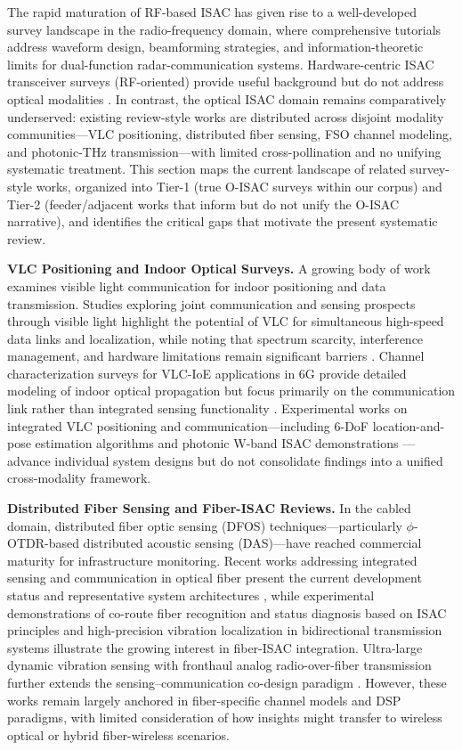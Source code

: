 The rapid maturation of RF-based ISAC has given rise to a well-developed survey landscape in the radio-frequency domain, where comprehensive tutorials address waveform design, beamforming strategies, and information-theoretic limits for dual-function radar-communication systems. Hardware-centric ISAC transceiver surveys (RF-oriented) provide useful background but do not address optical modalities \cite{O_ISAC_161}. In contrast, the optical ISAC domain remains comparatively underserved: existing review-style works are distributed across disjoint modality communities---VLC positioning, distributed fiber sensing, FSO channel modeling, and photonic-THz transmission---with limited cross-pollination and no unifying systematic treatment. This section maps the current landscape of related survey-style works, organized into Tier-1 (true O-ISAC surveys within our corpus) and Tier-2 (feeder/adjacent works that inform but do not unify the O-ISAC narrative), and identifies the critical gaps that motivate the present systematic review.

\textbf{VLC Positioning and Indoor Optical Surveys.} A growing body of work examines visible light communication for indoor positioning and data transmission. Studies exploring joint communication and sensing prospects through visible light highlight the potential of VLC for simultaneous high-speed data links and localization, while noting that spectrum scarcity, interference management, and hardware limitations remain significant barriers \cite{O_ISAC_068}. Channel characterization surveys for VLC-IoE applications in 6G provide detailed modeling of indoor optical propagation but focus primarily on the communication link rather than integrated sensing functionality \cite{O_ISAC_327}. Experimental works on integrated VLC positioning and communication---including 6-DoF location-and-pose estimation algorithms \cite{O_ISAC_062} and photonic W-band ISAC demonstrations \cite{O_ISAC_044}---advance individual system designs but do not consolidate findings into a unified cross-modality framework.

\textbf{Distributed Fiber Sensing and Fiber-ISAC Reviews.} In the cabled domain, distributed fiber optic sensing (DFOS) techniques---particularly $\phi$-OTDR-based distributed acoustic sensing (DAS)---have reached commercial maturity for infrastructure monitoring. Recent works addressing integrated sensing and communication in optical fiber present the current development status and representative system architectures \cite{O_ISAC_006}, while experimental demonstrations of co-route fiber recognition and status diagnosis based on ISAC principles \cite{O_ISAC_041} and high-precision vibration localization in bidirectional transmission systems \cite{O_ISAC_090} illustrate the growing interest in fiber-ISAC integration. Ultra-large dynamic vibration sensing with fronthaul analog radio-over-fiber transmission further extends the sensing--communication co-design paradigm \cite{O_ISAC_189}. However, these works remain largely anchored in fiber-specific channel models and DSP paradigms, with limited consideration of how insights might transfer to wireless optical or hybrid fiber-wireless scenarios.


